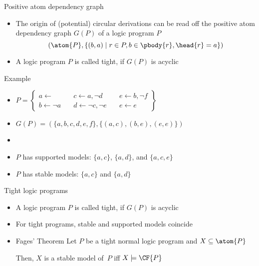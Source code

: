 \begin{frame}{Positive atom dependency graph}
  \bigskip
  \begin{itemize}
  \item<1->
    The origin of (potential) circular derivations can be read off the
    \alert{positive atom dependency graph} $G(P)$ of a logic program $P$
    \[
      (\atom{P}, \{(b,a) \mid r\in P, b \in \pbody{r}, \head{r}=a\})
    \]
    \smallskip
  \item<2-> A logic program $P$ is called \alert{tight}, if $G(P)$ is acyclic
  \end{itemize}
\end{frame}
\begin{frame}[c]{Example}
  \bigskip
  \begin{itemize}
  \item<1-> []
    \par\bigskip
    \(
    P
    =
    \left\{
      \begin{array}{lll}
        a \leftarrow                 \quad &
        c \leftarrow a, \neg d       \quad &
        e \leftarrow b, \neg f
        \\
        b \leftarrow \neg a         \quad &
        d \leftarrow \neg c, \neg e \quad &
        e \leftarrow e
      \end{array}
    \right\}
    \)
    \bigskip
    \bigskip
  \item<2->
    \(
    G(P)= (\{a,b,c,d,e,f\},\{(a,c),(b,e),(e,e)\})
    \)
  \item<3-> []
    \begin{center}
      
    \end{center}
  \item<4-> $P$ has supported models: $\{a,c\}$, $\{a,d\}$, and $\{a,c,e\}$
    \smallskip
  \item<4-> $P$ has stable    models: $\{a,c\}$ and $\{a,d\}$
  \end{itemize}
\end{frame}
\begin{frame}{Tight logic programs}
  \bigskip
  \begin{itemize}
  \item<1-> A logic program $P$ is called \alert{tight}, if $G(P)$ is acyclic
    \medskip
  \item<2-> For tight programs, stable and supported models coincide\pause[3]
    \bigskip
  \item<3->[] \par
    \begin{minipage}[t]{0.8\linewidth}
    \begin{block}{Fages' Theorem}
      Let $P$ be a tight normal logic program and $X\subseteq\atom{P}$
      \par\medskip
      Then, $X$ is a stable model of~$P$ iff $X\models\CF{P}$
    \end{block}
    \end{minipage}
  \end{itemize}
\end{frame}
